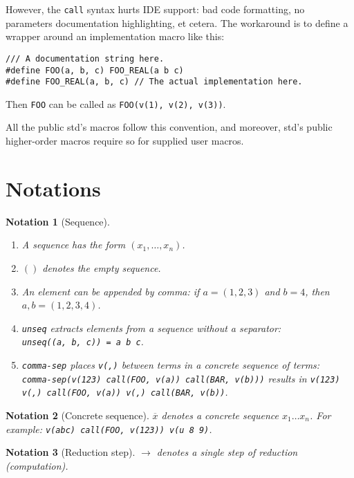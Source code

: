 \documentclass[12pt]{article}
\theoremstyle{break}
\newtheorem{notation}{Notation}
\begin{document}
However, the \texttt{call} syntax hurts IDE support: bad code formatting, no parameters
documentation highlighting, et cetera. The workaround is to define a wrapper around
an implementation macro like this:

\begin{verbatim}
/// A documentation string here.
#define FOO(a, b, c) FOO_REAL(a b c)
#define FOO_REAL(a, b, c) // The actual implementation here.
\end{verbatim}

Then \texttt{FOO} can be called as \texttt{FOO(v(1), v(2), v(3))}.

All the public std's macros follow this convention, and moreover, std's public
higher-order macros require so for supplied user macros.

\section{Notations}

\begin{notation}[Sequence]
    \begin{enumerate}
        \item A sequence has the form $(x_1, \ldots, x_n)$.
        \item $()$ denotes the empty sequence.
        \item An element can be appended by comma: if $a = (1, 2, 3)$ and $b = 4$, then $a, b = (1, 2, 3, 4)$.
        \item \texttt{unseq} extracts elements from a sequence without a separator: \\
        \texttt{unseq((a, b, c)) = a b c}.
        \item \texttt{comma-sep} places \texttt{v(,)} between terms in a concrete sequence of terms:\\
        \texttt{comma-sep(v(123) call(FOO, v(a)) call(BAR, v(b)))} results in
        \texttt{v(123) v(,) call(FOO, v(a)) v(,) call(BAR, v(b))}.
    \end{enumerate}
\end{notation}

\begin{notation}[Concrete sequence]
    $\overline{x}$ denotes a concrete sequence $x_1 \ldots x_n$. For example:
    \texttt{v(abc) call(FOO, v(123)) v(u 8 9)}.
\end{notation}

\begin{notation}[Reduction step]
    $\to$ denotes a single step of reduction (computation).
\end{notation}
\end{document}
